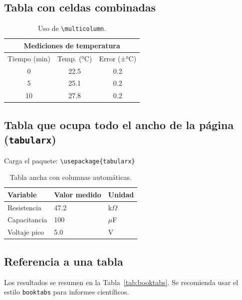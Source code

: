 \subsection{Tabla con celdas combinadas}

\begin{table}[htbp]
  \centering
  \begin{tabular}{|c|c|c|}
    \hline
    \multicolumn{3}{|c|}{Mediciones de temperatura} \\
    \hline
    Tiempo (min) & Temp. (°C) & Error (±°C) \\
    \hline
    0 & 22.5 & 0.2 \\
    5 & 25.1 & 0.2 \\
    10 & 27.8 & 0.2 \\
    \hline
  \end{tabular}
  \caption{Uso de \texttt{\textbackslash multicolumn}.}
  \label{tab:multicol}
\end{table}

\subsection{Tabla que ocupa todo el ancho de la página (\texttt{tabularx})}

Carga el paquete: \verb|\usepackage{tabularx}|

\begin{table}[htbp]
  \centering
  \begin{tabularx}{\textwidth}{|X|X|X|}
    \hline
    Variable & Valor medido & Unidad \\
    \hline
    Resistencia & 47.2 & k$\Omega$ \\
    Capacitancia & 100 & $\mu$F \\
    Voltaje pico & 5.0 & V \\
    \hline
  \end{tabularx}
  \caption{Tabla ancha con columnas automáticas.}
  \label{tab:tabularx}
\end{table}

\subsection{Referencia a una tabla}

Los resultados se resumen en la Tabla~\ref{tab:booktabs}.  
Se recomienda usar el estilo \texttt{booktabs} para informes científicos.